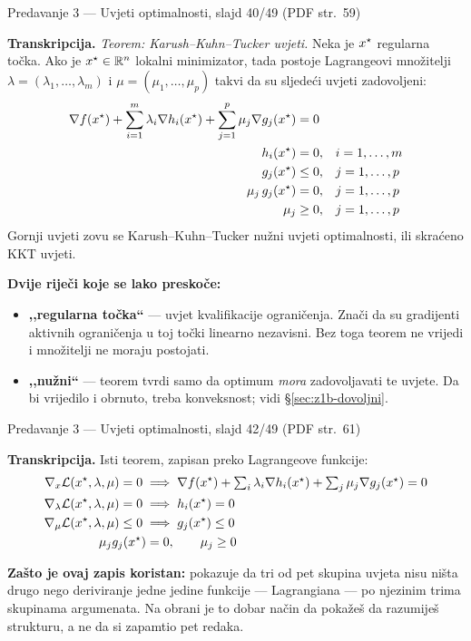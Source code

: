 \begin{izvor}{Predavanje 3 --- Uvjeti optimalnosti, slajd 40/49 (PDF str.~59)}

\textbf{Transkripcija.} \emph{Teorem: Karush--Kuhn--Tucker uvjeti.} Neka je
$x^{\star}$ regularna točka. Ako je $x^{\star} \in \mathbb{R}^n$ lokalni minimizator, tada
postoje Lagrangeovi množitelji $\lambda = (\lambda_1, \dots, \lambda_m)$ i
$\mu = (\mu_1, \dots, \mu_p)$ takvi da su sljedeći uvjeti zadovoljeni:
\begin{align*}
\nabla f(x^{\star}) + \sum_{i=1}^{m}\lambda_i \nabla h_i(x^{\star}) + \sum_{j=1}^{p}\mu_j \nabla g_j(x^{\star}) &= 0 & & \\
h_i(x^{\star}) &= 0, & & i = 1, \dots, m \\
g_j(x^{\star}) &\leq 0, & & j = 1, \dots, p \\
\mu_j\, g_j(x^{\star}) &= 0, & & j = 1, \dots, p \\
\mu_j &\geq 0, & & j = 1, \dots, p
\end{align*}
Gornji uvjeti zovu se Karush--Kuhn--Tucker nužni uvjeti optimalnosti, ili
skraćeno KKT uvjeti.

\textbf{Dvije riječi koje se lako preskoče:}
\begin{itemize}[nosep,leftmargin=*]
  \item \textbf{,,regularna točka``} --- uvjet kvalifikacije ograničenja. Znači da
        su gradijenti aktivnih ograničenja u toj točki linearno nezavisni. Bez
        toga teorem ne vrijedi i množitelji ne moraju postojati.
  \item \textbf{,,nužni``} --- teorem tvrdi samo da optimum \emph{mora}
        zadovoljavati te uvjete. Da bi vrijedilo i obrnuto, treba konveksnost;
        vidi \S\ref{sec:z1b-dovoljni}.
\end{itemize}
\end{izvor}

\begin{izvor}{Predavanje 3 --- Uvjeti optimalnosti, slajd 42/49 (PDF str.~61)}

\textbf{Transkripcija.} Isti teorem, zapisan preko Lagrangeove funkcije:
\begin{align*}
\nabla_x \mathcal{L}(x^{\star}, \lambda, \mu) = 0 \;&\Longrightarrow\;
   \nabla f(x^{\star}) + \textstyle\sum_i \lambda_i \nabla h_i(x^{\star}) + \sum_j \mu_j \nabla g_j(x^{\star}) = 0 \\
\nabla_\lambda \mathcal{L}(x^{\star}, \lambda, \mu) = 0 \;&\Longrightarrow\; h_i(x^{\star}) = 0 \\
\nabla_\mu \mathcal{L}(x^{\star}, \lambda, \mu) \leq 0 \;&\Longrightarrow\; g_j(x^{\star}) \leq 0 \\
\mu_j g_j(x^{\star}) &= 0, \qquad \mu_j \geq 0
\end{align*}

\textbf{Zašto je ovaj zapis koristan:} pokazuje da tri od pet skupina uvjeta nisu
ništa drugo nego deriviranje jedne jedine funkcije --- Lagrangiana --- po
njezinim trima skupinama argumenata. Na obrani je to dobar način da pokažeš da
razumiješ strukturu, a ne da si zapamtio pet redaka.
\end{izvor}

